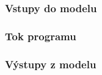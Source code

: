 %	
		
	
	\subsubsection{Vstupy do modelu} \label{kap:vstupy}
	 
	
	\subsubsection{Tok programu} \label{kap:tok}
	
	
	\subsubsection{Výstupy z modelu} \label{kap:vystupy}
	

